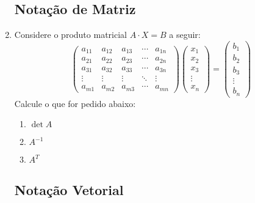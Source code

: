 \documentclass[a4paper,12pt]{article}
\begin{document}
\begin{enumerate}
\subsection{Notação de Matriz} 
 
 \item Considere o produto matricial $A \cdot X = B$ a seguir: 
  $$
  \begin{pmatrix}
   a_{11} & a_{12} & a_{13} & \cdots & a_{1n} \\
   a_{21} & a_{22} & a_{23} & \cdots & a_{2n} \\
   a_{31} & a_{32} & a_{33} & \cdots & a_{3n} \\
   \vdots & \vdots & \vdots & \ddots & \vdots \\
   a_{m1} & a_{m2} & a_{m3} & \cdots & a_{mn}
  \end{pmatrix}
  \begin{pmatrix}
   x_1 \\ x_2 \\ x_3 \\ \vdots \\ x_n
  \end{pmatrix}
  =
  \begin{pmatrix}
   b_1 \\ b_2 \\ b_3 \\ \vdots \\ b_n
  \end{pmatrix}
  $$
  Calcule o que for pedido abaixo:
  \begin{enumerate}
   \item $\det A$
   \item $A^{-1}$
   \item $A^T$
  \end{enumerate}
  
\subsection{Notação Vetorial}  
  

\end{enumerate}
\end{document}
